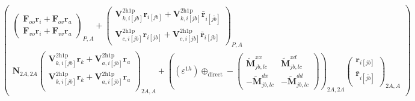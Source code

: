 \begin{align}
\begin{pmatrix}
 \begin{pmatrix}
\bm{F}_{oo}\bm{r}_i + \bm{F}_{ov}\bm{r}_a \\ \bm{F}_{vo}\bm{r}_i + \bm{F}_{vv}\bm{r}_a
\end{pmatrix}_{P,A} + \begin{pmatrix}
    \bm{V}^{2 \mathrm{h1p}}_{k,i[jb]}\bm{r}_{i[jb]} + \bm{V}^{2 \mathrm{h1p}}_{k,i[{jb}]}\bm{\bar{r}}_{i[\bar{jb}]}\\ \bm{V}^{2 \mathrm{h1p}}_{c,i[jb]}\bm{r}_{i[jb]} + \bm{V}^{2 \mathrm{h1p}}_{c,i[{jb}]}\bm{\bar{r}}_{i[{jb}]}
\end{pmatrix}_{P,A} \\[6pt]
 \bm{N}_{2A,2A}\begin{pmatrix}
    \bm{V}^{2 \mathrm{h1p}}_{k,i[jb]}\bm{r}_k+ \bm{V}^{2 \mathrm{h1p}}_{a,i[jb]}\bm{r}_a \\
\bm{V}^{2 \mathrm{h1p}}_{k,i[jb]}\bm{r}_k+ \bm{V}^{2 \mathrm{h1p}}_{a,i[jb]}\bm{r}_a \\
\end{pmatrix}_{2A,A} +
\left(\left(\varepsilon^{1h}\right) \oplus_{\text{direct}} -\begin{pmatrix}
\bm{\tilde{M}}^{xx}_{jb,lc} & \bm{\tilde{M}}^{xd}_{jb,lc} \\
-\bm{\tilde{M}}^{dx}_{jb,lc} & -\bm{\tilde{M}}^{dd}_{jb,lc}
\end{pmatrix}\right)_{2A,2A} \begin{pmatrix}
    \bm{r}_{i[jb]} \\
\bm{\bar{r}}_{i[\bar{jb}]}
\end{pmatrix}_{2A,A}
\end{pmatrix} \\

\end{align}
